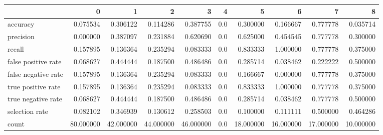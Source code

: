 \begin{tabular}{lrrrrrrrrr}
\toprule
{} &          0 &          1 &          2 &          3 &    4 &          5 &          6 &          7 &          8 \\
\midrule
accuracy            &   0.075534 &   0.306122 &   0.114286 &   0.387755 &  0.0 &   0.300000 &   0.166667 &   0.777778 &   0.035714 \\
precision           &   0.000000 &   0.387097 &   0.231884 &   0.620690 &  0.0 &   0.625000 &   0.454545 &   0.777778 &   0.300000 \\
recall              &   0.157895 &   0.136364 &   0.235294 &   0.083333 &  0.0 &   0.833333 &   1.000000 &   0.777778 &   0.375000 \\
false positive rate &   0.068627 &   0.444444 &   0.187500 &   0.486486 &  0.0 &   0.285714 &   0.038462 &   0.222222 &   0.500000 \\
false negative rate &   0.157895 &   0.136364 &   0.235294 &   0.083333 &  0.0 &   0.166667 &   0.000000 &   0.777778 &   0.375000 \\
true positive rate  &   0.157895 &   0.136364 &   0.235294 &   0.083333 &  0.0 &   0.833333 &   1.000000 &   0.777778 &   0.375000 \\
true negative rate  &   0.068627 &   0.444444 &   0.187500 &   0.486486 &  0.0 &   0.285714 &   0.038462 &   0.777778 &   0.500000 \\
selection rate      &   0.082102 &   0.346939 &   0.130612 &   0.258503 &  0.0 &   0.100000 &   0.111111 &   0.500000 &   0.464286 \\
count               &  80.000000 &  42.000000 &  44.000000 &  46.000000 &  0.0 &  18.000000 &  16.000000 &  17.000000 &  10.000000 \\
\bottomrule
\end{tabular}
